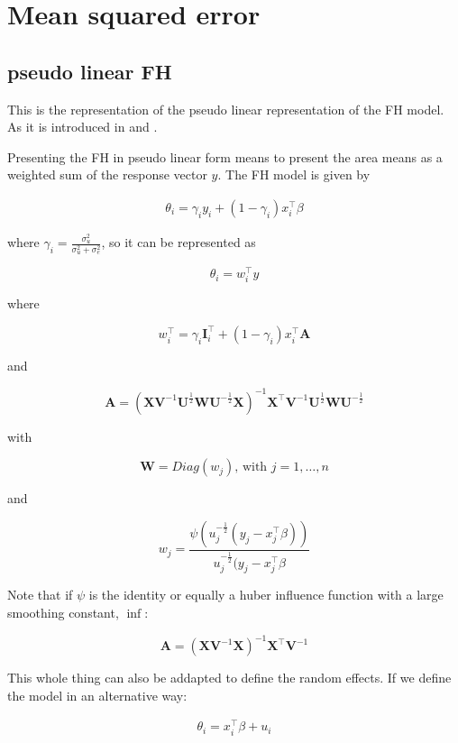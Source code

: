 \section{Mean squared error}\label{mean-squared-error}

\subsection{pseudo linear FH}\label{pseudo-linear-fh}

This is the representation of the pseudo linear representation of the FH
model. As it is introduced in \textcite{Cha11} and \textcite{Cha14}.

Presenting the FH in pseudo linear form means to present the area means
as a weighted sum of the response vector $y$. The FH model is given by

\begin{align}
\theta_i = \gamma_i y_i + (1 - \gamma_i) x_i^\top \beta 
\end{align}

where $\gamma_i = \frac{\sigma^2_u}{\sigma^2_u + \sigma^2_e}$, so it can
be represented as

\[
\theta_i = w_i^\top y
\]

where

\[
w_i^\top = \gamma_i \mathbf{I}^\top_i + (1 - \gamma_i) x_i^\top \mathbf{A}
\]

and

\[
\mathbf{A} = \left(\mathbf{X} \mathbf{V}^{-1} \mathbf{U}^\frac{1}{2} \mathbf{W} \mathbf{U}^{-\frac{1}{2}} \mathbf{X} \right)^{-1} \mathbf{X}^\top \mathbf{V}^{-1} \mathbf{U}^\frac{1}{2} \mathbf{W} \mathbf{U}^{-\frac{1}{2}}
\]

with

\[
\mathbf{W} = Diag(w_j)\text{, with } j = 1, \dots, n
\]

and

\[
w_j = \frac{\psi\left( u_j^{-\frac{1}{2}} ( y_j - x_j^\top\beta ) \right)}{ u_j^{-\frac{1}{2}} ( y_j - x_j^\top\beta }
\]

Note that if $\psi$ is the identity or equally a huber influence
function with a large smoothing constant, \ie $\inf$:

\[
\mathbf{A} = \left(\mathbf{X} \mathbf{V}^{-1} \mathbf{X} \right)^{-1} \mathbf{X}^\top \mathbf{V}^{-1}
\]

This whole thing can also be addapted to define the random effects. If
we define the model in an alternative way:

\begin{align}
\theta_i = x_i^\top \beta + u_i
\end{align}

